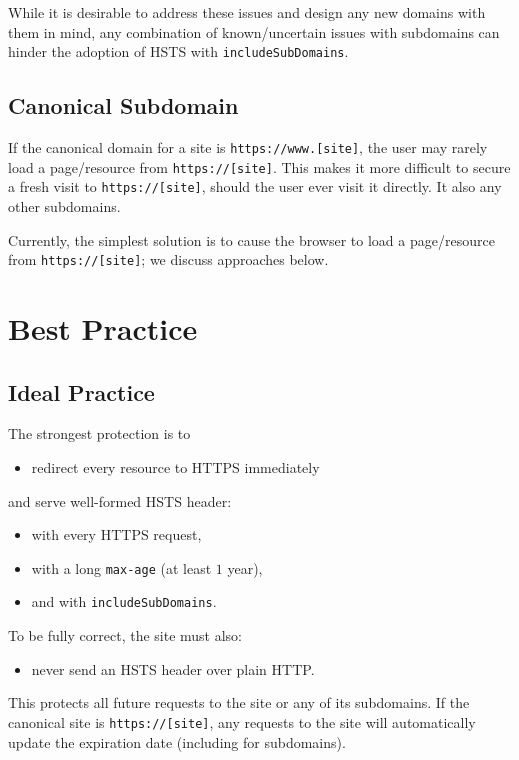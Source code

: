 \documentclass[conference]{./IEEEtran}
\newcommand{\site}[1]{\texttt{#1}}
\newcommand{\code}[1]{\texttt{#1}}
\newcommand{\iSD}{{\code{includeSubDomains}}}
\newcommand{\genericsite}{[site]}
\newcommand{\s}{{\site{https://\genericsite}}}
\newcommand{\sw}{{\site{https://www.\genericsite}}}
\theoremstyle{plain}
\begin{document}
While it is desirable to address these issues and design any new domains with them in mind, any combination of known/uncertain issues with subdomains can hinder the adoption of HSTS with \iSD.

\subsection{Canonical Subdomain}

If the canonical domain for a site is \sw, the user may rarely load a page/resource from \s. This makes it more difficult to secure a fresh visit to \s, should the user ever visit it directly. It also  any other subdomains.

Currently, the simplest solution is to cause the browser to load a page/resource from \s; we discuss approaches below.


\section{Best Practice}


\subsection{Ideal Practice}


The strongest protection is to

\begin{itemize}
\item redirect every resource to HTTPS immediately
\end{itemize}

and serve well-formed  HSTS header:

\begin{itemize}
\item with every HTTPS request,
\item with a long \code{max-age} (at least $1$ year),
\item and with \iSD.
\end{itemize}

To be fully correct, the site must also:

\begin{itemize}
\item never send an HSTS header over plain HTTP.
\end{itemize}

This protects all future requests to the site or any of its subdomains. If the canonical site is \s, any requests to the site will automatically update the expiration date (including for subdomains).
\end{document}
